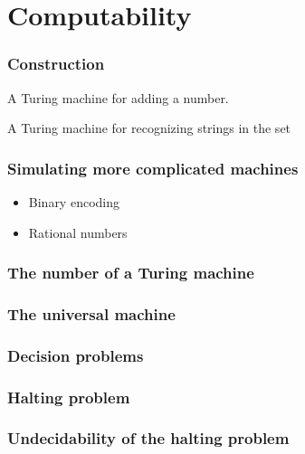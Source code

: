 
\chapter{Computability}
\subsection{Construction}
\begin{example}
A Turing machine for adding a number.
\end{example}
\begin{example}
A Turing machine for recognizing strings in the set 
\end{example}
\subsection{Simulating more complicated machines}
\begin{itemize}
\item Binary encoding
\item Rational numbers
\end{itemize}
\subsection{The number of a Turing machine}
\subsection{The universal machine}
\subsection{Decision problems}
\subsection{Halting problem}
\subsection{Undecidability of the halting problem}
